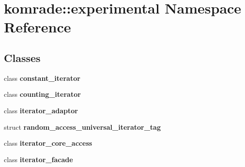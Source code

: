 \section{komrade::experimental Namespace Reference}
\label{namespacekomrade_1_1experimental}


\subsection*{Classes}
\begin{CompactItemize}
\item 
class \textbf{constant\_\-iterator}
\item 
class \textbf{counting\_\-iterator}
\item 
class \textbf{iterator\_\-adaptor}
\item 
struct \textbf{random\_\-access\_\-universal\_\-iterator\_\-tag}
\item 
class \textbf{iterator\_\-core\_\-access}
\item 
class \textbf{iterator\_\-facade}
\end{CompactItemize}
